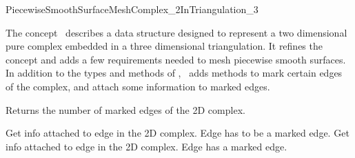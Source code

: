

\begin{ccRefConcept}{PiecewiseSmoothSurfaceMeshComplex_2InTriangulation_3}


\ccDefinition
  
The concept \ccRefName\ describes a data structure
designed  to represent a  two dimensional pure complex 
embedded in a three dimensional triangulation. It refines the concept
 and adds a few requirements
needed to mesh piecewise smooth surfaces. In addition to the types and methods
of , \ccRefName\ adds methods to mark
certain edges of the complex, and attach some information to marked edges.

\ccRefines
{}

\ccTypes
{}



\ccGlue
{}

{Returns the number of marked edges of the 2D complex.}

{Get info attached
to edge  in the 2D complex.
\ccPrecond Edge  has to be a marked edge.}
\ccGlue
{}
{Get info attached
to edge  in the 2D complex.
\ccPrecond Edge  has a marked edge.}





\end{ccRefConcept}
